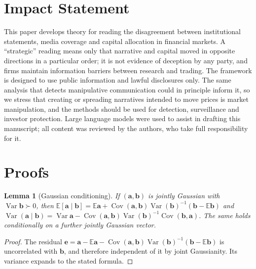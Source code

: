 \documentclass{article}
\theoremstyle{plain}
\newtheorem{lemma}[theorem]{Lemma}
\theoremstyle{definition}
\theoremstyle{remark}
\newcommand{\E}{\mathbb{E}}
\DeclareMathOperator{\Var}{Var}
\DeclareMathOperator{\Cov}{Cov}
\begin{document}


\section*{Impact Statement}

This paper develops theory for reading the disagreement between institutional statements, media coverage and capital allocation in financial markets. A ``strategic'' reading means only that narrative and capital moved in opposite directions in a particular order; it is not evidence of deception by any party, and firms maintain information barriers between research and trading. The framework is designed to use public information and lawful disclosures only. The same analysis that detects manipulative communication could in principle inform it, so we stress that creating or spreading narratives intended to move prices is market manipulation, and the methods should be used for detection, surveillance and investor protection. Large language models were used to assist in drafting this manuscript; all content was reviewed by the authors, who take full responsibility for it.




\newpage
\appendix
\onecolumn

\section{Proofs}\label{app:proofs}

\begin{lemma}[Gaussian conditioning]\label{lem:gauss}
If $(\bm a,\bm b)$ is jointly Gaussian with $\Var\bm b\succ0$, then $\E[\bm a\mid\bm b]=\E\bm a+\Cov(\bm a,\bm b)\Var(\bm b)^{-1}(\bm b-\E\bm b)$ and $\Var(\bm a\mid\bm b)=\Var\bm a-\Cov(\bm a,\bm b)\Var(\bm b)^{-1}\Cov(\bm b,\bm a)$. The same holds conditionally on a further jointly Gaussian vector.
\end{lemma}
\begin{proof}
The residual $\bm e=\bm a-\E\bm a-\Cov(\bm a,\bm b)\Var(\bm b)^{-1}(\bm b-\E\bm b)$ is uncorrelated with $\bm b$, and therefore independent of it by joint Gaussianity. Its variance expands to the stated formula.
\end{proof}
\end{document}
